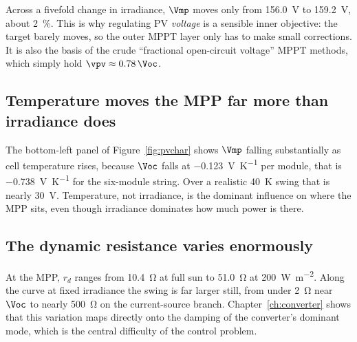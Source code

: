 Across a fivefold change in irradiance, $\Vmp$ moves only from
\SI{156.0}{\volt} to \SI{159.2}{\volt}, about \SI{2}{\percent}. This is why
regulating PV \emph{voltage} is a sensible inner objective: the target barely
moves, so the outer MPPT layer only has to make small corrections. It is also
the basis of the crude ``fractional open-circuit voltage'' MPPT methods, which
simply hold $\vpv \approx 0.78\,\Voc$.

\subsection{Temperature moves the MPP far more than irradiance does}

The bottom-left panel of Figure~\ref{fig:pvchar} shows $\Vmp$ falling
substantially as cell temperature rises, because $\Voc$ falls at
\SI{-0.123}{\volt\per\kelvin} per module, that is \SI{-0.738}{\volt\per\kelvin}
for the six-module string. Over a realistic \SI{40}{\kelvin} swing that is
nearly \SI{30}{\volt}. Temperature, not irradiance, is the dominant influence on
where the MPP sits, even though irradiance dominates how much power is there.

\subsection{The dynamic resistance varies enormously}

At the MPP, $r_d$ ranges from \SI{10.4}{\ohm} at full sun to \SI{51.0}{\ohm} at
\SI{200}{\watt\per\square\metre}. Along the curve at fixed irradiance the swing
is far larger still, from under \SI{2}{\ohm} near $\Voc$ to nearly
\SI{500}{\ohm} on the current-source branch. Chapter~\ref{ch:converter} shows
that this variation maps directly onto the damping of the converter's dominant
mode, which is the central difficulty of the control problem.
